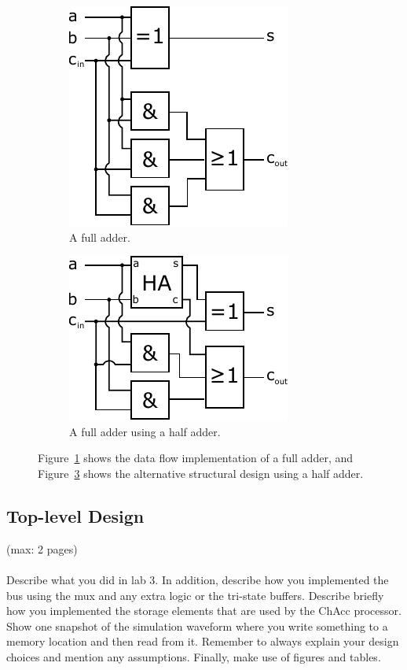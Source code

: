 \documentclass[a4,11pt]{article}
\begin{document}
\begin{figure}[h!]
	\centering
 	\begin{subfigure}{.5\textwidth}
		\centering
		\includegraphics[height=.3\textheight]{Figurer/fa}
		\caption{A full adder.}
		\label{fig:fa} 
	\end{subfigure}%
	\begin{subfigure}{.5\textwidth}
		\centering
		\includegraphics[height=.3\textheight]{Figurer/fa2}
		\caption{A full adder using a half adder.}
		\label{fig:fa2} 
  	\end{subfigure}
	\caption{Figure~\ref{fig:fa} shows the data flow implementation of a full adder,
		and Figure~\ref{fig:fa2} shows the alternative structural design using a half adder.}
\end{figure}

\newpage

\subsection{Top-level Design}
(max: 2 pages)
\\\\
Describe what you did in lab 3. In addition, describe how you implemented the bus using the mux and any extra logic or the tri-state buffers. Describe briefly how you implemented the storage elements that are used by the ChAcc processor. Show one snapshot of the simulation waveform where you write something to a memory location and then read from it. Remember to always explain your design choices and mention any assumptions. Finally, make use of figures and tables. 
\end{document}
